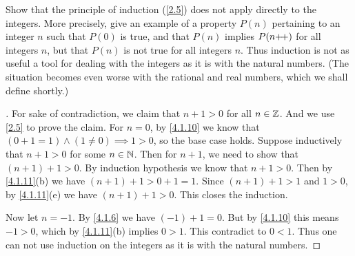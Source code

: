 \begin{ex}\label{ex:4.1.8}
  Show that the principle of induction (\cref{2.5}) does not apply directly to the integers.
  More precisely, give an example of a property \(P(n)\) pertaining to an integer \(n\) such that \(P(0)\) is true, and that \(P(n)\) implies \(P(n{+}\!{+})\) for all integers \(n\), but that \(P(n)\) is not true for all integers \(n\).
  Thus induction is not as useful a tool for dealing with the integers as it is with the natural numbers.
  (The situation becomes even worse with the rational and real numbers, which we shall define shortly.)
\end{ex}

\begin{proof}[]
  For sake of contradiction, we claim that \(n + 1 > 0\) for all \(n \in \mathbb{Z}\).
  And we use \cref{2.5} to prove the claim.
  For \(n = 0\), by \cref{4.1.10} we know that \((0 + 1 = 1) \land (1 \neq 0) \implies 1 > 0\), so the base case holds.
  Suppose inductively that \(n + 1 > 0\) for some \(n \in \mathbb{N}\).
  Then for \(n + 1\), we need to show that \((n + 1) + 1 > 0\).
  By induction hypothesis we know that \(n + 1 > 0\).
  Then by \cref{4.1.11}(b) we have \((n + 1) + 1 > 0 + 1 = 1\).
  Since \((n + 1) + 1 > 1\) and \(1 > 0\), by \cref{4.1.11}(e) we have \((n + 1) + 1 > 0\).
  This closes the induction.

  Now let \(n = -1\).
  By \cref{4.1.6} we have \((-1) + 1 = 0\).
  But by \cref{4.1.10} this means \(-1 > 0\), which by \cref{4.1.11}(b) implies \(0 > 1\).
  This contradict to \(0 < 1\).
  Thus one can not use induction on the integers as it is with the natural numbers.
\end{proof}
